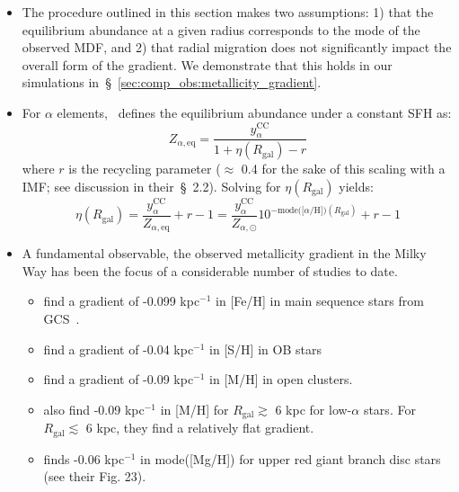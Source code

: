 \documentclass[fleqn, usenatbib]{mnras}
\begin{document}
\begin{itemize}
	\item The procedure outlined in this section makes two assumptions: 1) 
	that the equilibrium abundance at a given radius corresponds to the mode 
	of the observed MDF, and 2) that radial migration does not significantly 
	impact the overall form of the gradient. We demonstrate that this holds in 
	our simulations in~\S~\ref{sec:comp_obs:metallicity_gradient}. 

	\item For $\alpha$ elements,~\citet{Weinberg2017} defines the equilibrium 
	abundance under a constant SFH as: 
	\begin{equation} 
	Z_{\alpha,\text{eq}} = \frac{
		y_\alpha^\text{CC}
	}{
		1 + \eta(R_\text{gal}) - r
	} 
	\end{equation} 
	where $r$ is the recycling parameter ($\approx$ 0.4 for the sake of this 
	scaling with a~ IMF; see discussion in their~\S~2.2). 
	Solving for $\eta(R_\text{gal})$ yields: 
	\begin{equation} 
	\eta(R_\text{gal}) = \frac{
		y_\alpha^\text{CC}
	}{
		Z_{\alpha,\text{eq}}
	} + r - 1 
	= \frac{y_\alpha^\text{CC}}{Z_{\alpha,\odot}}10^{-\text{mode([$\alpha$/H])}
	(R_\text{gal})} + r - 1 
	\end{equation} 

	\item A fundamental observable, the observed metallicity gradient in the 
	Milky Way has been the focus of a considerable number of studies to date. 
	\begin{itemize} 
		\item \citet{Nordstroem2004a} find a gradient of -0.099 kpc$^{-1}$ in 
		[Fe/H] in main sequence stars from GCS~\citep{Nordstroem2004b, 
		Holmberg2007}. 

		\item \citet{Daflon2009} find a gradient of -0.04 kpc$^{-1}$ in 
		[S/H] in OB stars 

		\item \citet{Frinchaboy2013} find a gradient of -0.09 kpc$^{-1}$ in 
		[M/H] in open clusters. 

		\item \citet{Hayden2014} also find -0.09 kpc$^{-1}$ in [M/H] for 
		$R_\text{gal}\gtrsim$ 6 kpc for low-$\alpha$ stars. For 
		$R_\text{gal}\lesssim$ 6 kpc, they find a relatively flat gradient. 

		\item \citet{Weinberg2019} finds -0.06 kpc$^{-1}$ in mode([Mg/H]) for 
		upper red giant branch disc stars (see their Fig. 23). 
	\end{itemize} 


\end{itemize}
\end{document}
